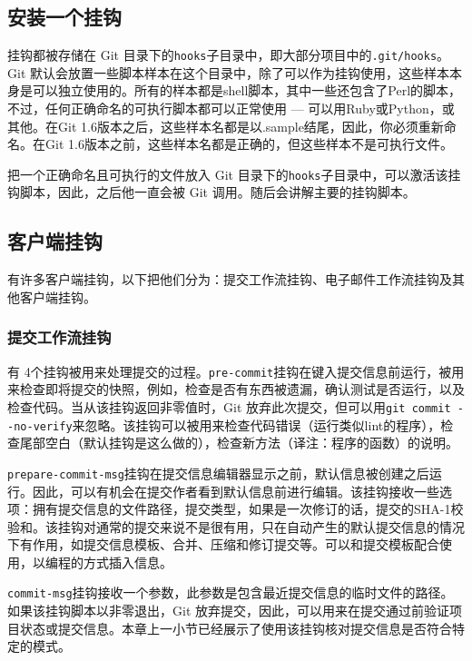 \documentclass[a4paper]{book}
\begin{document}
\subsection{安装一个挂钩}

挂钩都被存储在 Git 目录下的\texttt{hooks}子目录中，即大部分项目中的\texttt{.git/hooks}。 Git 默认会放置一些脚本样本在这个目录中，除了可以作为挂钩使用，这些样本本身是可以独立使用的。所有的样本都是shell脚本，其中一些还包含了Perl的脚本，不过，任何正确命名的可执行脚本都可以正常使用 --- 可以用Ruby或Python，或其他。在Git 1.6版本之后，这些样本名都是以.sample结尾，因此，你必须重新命名。在Git 1.6版本之前，这些样本名都是正确的，但这些样本不是可执行文件。

把一个正确命名且可执行的文件放入 Git 目录下的\texttt{hooks}子目录中，可以激活该挂钩脚本，因此，之后他一直会被 Git 调用。随后会讲解主要的挂钩脚本。

\subsection{客户端挂钩}

有许多客户端挂钩，以下把他们分为：提交工作流挂钩、电子邮件工作流挂钩及其他客户端挂钩。

\subsubsection{提交工作流挂钩}

有 4个挂钩被用来处理提交的过程。\texttt{pre-commit}挂钩在键入提交信息前运行，被用来检查即将提交的快照，例如，检查是否有东西被遗漏，确认测试是否运行，以及检查代码。当从该挂钩返回非零值时，Git 放弃此次提交，但可以用\texttt{git commit -{}-no-verify}来忽略。该挂钩可以被用来检查代码错误（运行类似lint的程序），检查尾部空白（默认挂钩是这么做的），检查新方法（译注：程序的函数）的说明。

\texttt{prepare-commit-msg}挂钩在提交信息编辑器显示之前，默认信息被创建之后运行。因此，可以有机会在提交作者看到默认信息前进行编辑。该挂钩接收一些选项：拥有提交信息的文件路径，提交类型，如果是一次修订的话，提交的SHA-1校验和。该挂钩对通常的提交来说不是很有用，只在自动产生的默认提交信息的情况下有作用，如提交信息模板、合并、压缩和修订提交等。可以和提交模板配合使用，以编程的方式插入信息。

\texttt{commit-msg}挂钩接收一个参数，此参数是包含最近提交信息的临时文件的路径。如果该挂钩脚本以非零退出，Git 放弃提交，因此，可以用来在提交通过前验证项目状态或提交信息。本章上一小节已经展示了使用该挂钩核对提交信息是否符合特定的模式。
\end{document}
